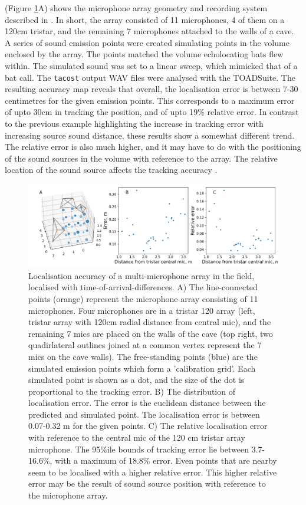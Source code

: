 \documentclass[
]{book}
\begin{document}
(Figure \ref{tacostfig2}A) shows the microphone array geometry and recording system described in \citep{Batstone2019}. In short, the array consisted of 11 microphones, 4 of them on a 120cm tristar, and the remaining 7 microphones attached to the walls of a cave. A series of sound emission points were created simulating points in the volume enclosed by the array. The points matched the volume echolocating bats flew within. The simulated sound was set to a linear sweep, which mimicked that of a bat call. The \texttt{tacost} output WAV files were analysed with the TOADSuite. The resulting accuracy map reveals that overall, the localisation error is between 7-30 centimetres for the given emission points. This corresponds to a maximum error of upto 30cm in tracking the position, and of upto 19\(\%\) relative error. In contrast to the previous example highlighting the increase in tracking error with increasing source sound distance, these results show a somewhat different trend. The relative error is also much higher, and it may have to do with the positioning of the sound sources in the volume with reference to the array. The relative location of the sound source affects the tracking accuracy \citep{aubauer1996acoustical}.

\begin{figure}
\includegraphics[width=1.0\columnwidth]{original_papers/tacost/data_for_figures/analysis/fig2_points_and_error.png}
\centering
\caption{Localisation accuracy of a multi-microphone array in the field, localised with time-of-arrival-differences. A) The line-connected points (orange) represent the microphone array consisting of 11 microphones. Four microphones are in a tristar 120 array (left, tristar array with 120cm radial distance from central mic), and 
the remaining 7 mics are placed on the walls of the cave (top right, two quadirlateral outlines joined at a common vertex represent the 7 mics on the cave walls). The free-standing points (blue) are  the simulated emission points which form a 'calibration grid'. Each simulated point is shown as a dot, and the size of the dot is proportional to the tracking error. B) The distribution of localisation error. The error is 
the euclidean distance between the predicted and simulated point. The localisation error is between 0.07-0.32 m for the given points. C) The relative localisation error with reference to the central mic of the 120 cm tristar array microphone. The 95$\%$ile bounds of tracking error lie between 3.7-16.6$\%$, with a maximum of 18.8$\%$ error. Even points that are nearby seem to be localised with a higher relative error. This higher relative error may be the result of sound source position with reference to the microphone array.}
\label{tacostfig2}
\end{figure}
\end{document}
